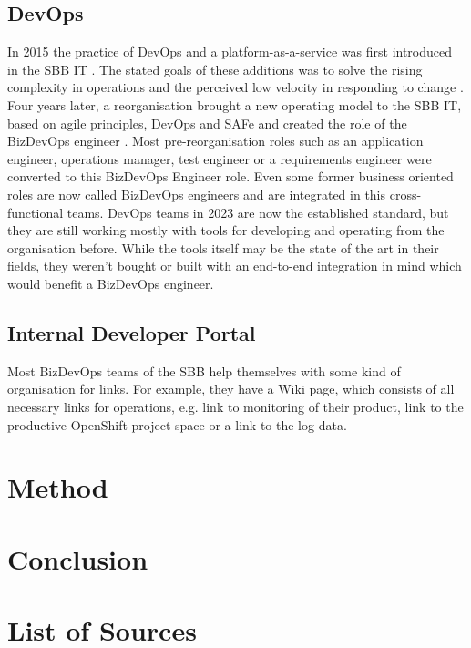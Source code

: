 \documentclass[a4paper,12pt]{article}
\begin{document}
    \subsection{DevOps}
    \label{subsec:sbbdevops}
    In 2015 the practice of DevOps and a platform-as-a-service was first introduced in the SBB IT .
    The stated goals of these additions was to solve the rising complexity in operations and the perceived low velocity
    in responding to change\parencite{sbbdevops} .
    Four years later, a reorganisation brought a new operating model to the SBB IT, based on agile principles, DevOps and SAFe
    and created the role of the BizDevOps engineer\parencite{sbbagile} .
    Most pre-reorganisation roles such as an application engineer, operations manager, test engineer or a requirements engineer
    were converted to this BizDevOps Engineer role.
    Even some former business oriented roles are now called BizDevOps engineers and are integrated in this cross-functional
    teams.
    DevOps teams in 2023 are now the established standard, but they are still working mostly with tools for developing and
    operating from the organisation before.
    While the tools itself may be the state of the art in their fields, they weren't bought or built with an end-to-end
    integration in mind which would benefit a BizDevOps engineer.

    \subsection{Internal Developer Portal}
    \label{subsec:sbbportal}
    Most BizDevOps teams of the SBB help themselves with some kind of organisation for links.
    For example, they have a Wiki page, which consists of all necessary links for operations, e.g. link to monitoring
    of their product,    link to the productive OpenShift project space or a link to the log data.


    \section{Method}
    \label{sec:method}


    \section{Conclusion}
    \label{sec:conclusion}
    \pagebreak


    \section{List of Sources}
    \label{sec:bibliograhpy}
    \printbibliography[heading=none]
\end{document}
